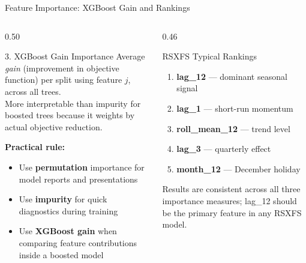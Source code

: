 \documentclass[aspectratio=169, 10pt]{beamer}
\begin{document}
\begin{frame}{Feature Importance: XGBoost Gain and Rankings}
  \begin{columns}[T]
    \begin{column}{0.50\textwidth}
      \begin{definitionbox}{3. XGBoost Gain Importance}
        \footnotesize
        Average \emph{gain} (improvement in objective function)
        per split using feature $j$, across all trees.\\[2pt]
        More interpretable than impurity for boosted trees
        because it weights by actual objective reduction.
      \end{definitionbox}

      \medskip
      \textbf{Practical rule:}
      \begin{itemize}\footnotesize
        \item Use \textbf{permutation} importance for model reports and presentations
        \item Use \textbf{impurity} for quick diagnostics during training
        \item Use \textbf{XGBoost gain} when comparing feature contributions\\inside a boosted model
      \end{itemize}
    \end{column}
    \begin{column}{0.46\textwidth}
      \begin{examplebox}{RSXFS Typical Rankings}
        \begin{enumerate}
          \item \textbf{lag\_12} — dominant seasonal signal
          \item \textbf{lag\_1} — short-run momentum
          \item \textbf{roll\_mean\_12} — trend level
          \item \textbf{lag\_3} — quarterly effect
          \item \textbf{month\_12} — December holiday
        \end{enumerate}
        Results are consistent across all three importance measures; lag\_12 should be the primary feature in any RSXFS model.
      \end{examplebox}
    \end{column}
  \end{columns}
\end{frame}
\end{document}
